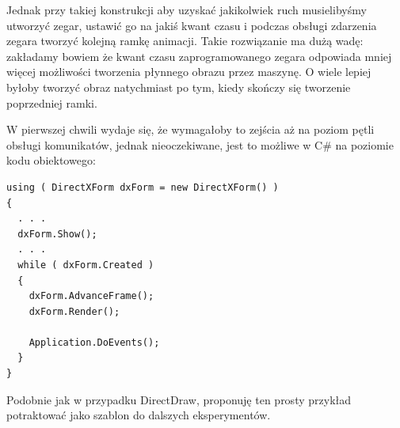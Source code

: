 Jednak przy takiej konstrukcji aby uzyskać jakikolwiek ruch musielibyśmy utworzyć zegar, 
ustawić go na jakiś kwant czasu i podczas obsługi zdarzenia zegara tworzyć kolejną ramkę animacji. 
Takie rozwiązanie ma dużą wadę: zakładamy bowiem że kwant czasu zaprogramowanego zegara odpowiada mniej 
więcej możliwości tworzenia płynnego obrazu przez maszynę. O wiele lepiej byłoby tworzyć obraz 
natychmiast po tym, kiedy skończy się tworzenie poprzedniej ramki. 

W pierwszej chwili wydaje się, że wymagałoby to zejścia aż na poziom pętli obsługi komunikatów, 
jednak nieoczekiwane, jest to możliwe w C\# na poziomie kodu obiektowego:

\label{netPetlaObslugiKomunikatow}

\begin{scriptsize}
\begin{verbatim}
using ( DirectXForm dxForm = new DirectXForm() )
{
  . . .			
  dxForm.Show();
  . . .
  while ( dxForm.Created )
  {
    dxForm.AdvanceFrame();
    dxForm.Render();

    Application.DoEvents();
  }
}
\end{verbatim}
\end{scriptsize}

Podobnie jak w przypadku DirectDraw, proponuję ten prosty przykład potraktować jako szablon do 
dalszych eksperymentów. 

